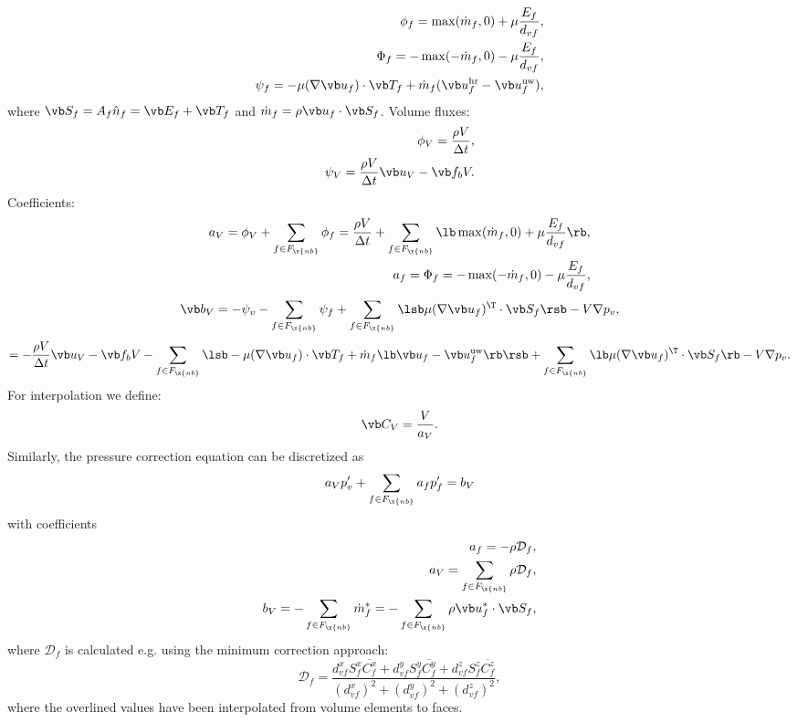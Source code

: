 \documentclass[12pt]{article}
\newcommand{\fnb}{F_{\x{nb}}}
\begin{document}
\begin{align}
  \phi_f = \max(\dot m_f, 0) + \mu \frac{E_f}{d_{vf}}, \\
  \Phi_f = -\max(-\dot m_f, 0) - \mu \frac{E_f}{d_{vf}}, \\
  \psi_f = - \mu (\nabla \vb u_f) \cdot \vb T_f + \dot m_f (\vb u_f^{\text{hr}} - \vb u_f^{\text{uw}}),
\end{align}
where $\vb S_f = A_f \hat n_f = \vb E_f + \vb T_f$ and $\dot m_f = \rho \vb u_f \cdot \vb S_f$.
Volume fluxes:
\begin{align}
  \phi_V = \frac{\rho V}{\Delta t}, \\
  \psi_V = \frac{\rho V}{\Delta t} \vb u_V - \vb f_b V.
\end{align}
Coefficients:
\begin{align}
  a_V = \phi_V + \sum_{f \in \fnb} \phi_f = \frac{\rho V}{\Delta t} + \sum_{f \in \fnb} \lb \max(\dot m_f, 0) + \mu \frac{E_f}{d_{vf}} \rb, \\
  a_f = \Phi_f = -\max(-\dot m_f, 0) - \mu \frac{E_f}{d_{vf}},
\end{align}
\begin{equation}
  \vb b_V = -\psi_v - \sum_{f \in \fnb} \psi_f + \sum_{f \in \fnb} \lsb \mu (\nabla \vb u_f)^\T \cdot \vb S_f \rsb - V \nabla p_v,
\end{equation}
$$
= - \frac{\rho V}{\Delta t} \vb u_V - \vb f_b V - \sum_{f \in \fnb} \lsb - \mu (\nabla \vb u_f) \cdot \vb T_f + \dot m_f \lb \vb u_f - \vb u_f^{\text{uw}}\rb \rsb + \sum_{f \in \fnb} \lb \mu (\nabla \vb u_f)^\T \cdot \vb S_f \rb - V \nabla p_v.
$$
For interpolation we define:
$$
\vb C_V = \frac{V}{a_V}.
$$
Similarly, the pressure correction equation can be discretized as \cite{mou}
\begin{equation}
  a_V p_v' + \sum_{f \in \fnb} a_f p_f' = b_V
\end{equation}
with coefficients
\begin{align}
  a_f = -\rho \mathcal{D}_f, \\
  a_V = \sum_{f \in \fnb} \rho \mathcal{D}_f,\\
  b_V = - \sum_{f \in \fnb} \dot m_f^* = - \sum_{f \in \fnb} \rho \vb u_f^* \cdot \vb S_f,
\end{align}
where $\mathcal{D}_f$ is calculated e.g. using the minimum correction approach:
$$
\mathcal{D}_f = \frac{d_{vf}^x S_f^x \overline{C_f^x} + d_{vf}^y S_f^y \overline{C_f^y} + d_{vf}^z S_f^z \overline{C_f^z}}{(d_{vf}^x)^2 + (d_{vf}^y)^2 + (d_{vf}^z)^2},
$$
where the overlined values have been interpolated from volume elements to faces.
\end{document}
